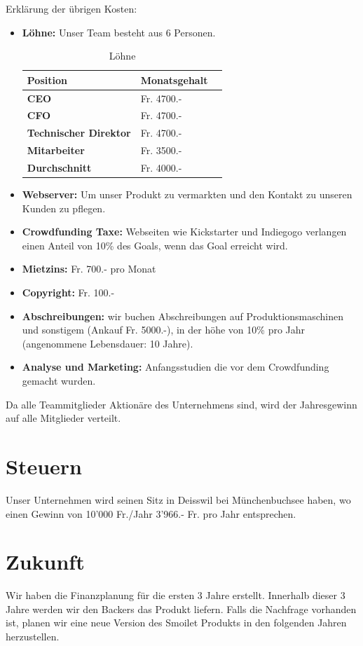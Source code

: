 Erkl\"arung der \"ubrigen Kosten:\\
\begin{itemize}
\item \textbf{L\"ohne:} Unser Team besteht aus 6 Personen. \\
\begin{table}[H]
\centering
\caption{L\"ohne}
\label{L\"ohne}
\begin{tabular}{lll}
\textbf{Position} & \textbf{Monatsgehalt}  \\ \hline
  \textbf{CEO} &  Fr. 4700.- \\ \hline
 \textbf{CFO} &  Fr. 4700.- \\ \hline
 \textbf{Technischer Direktor}& Fr. 4700.-  \\ \hline
 \textbf{Mitarbeiter} &Fr.  3500.- \\ \hline
 \textbf{Durchschnitt} & Fr. 4000.-\\ \hline
\end{tabular}
\end{table}
\item \textbf{Webserver:} Um unser Produkt zu vermarkten und den Kontakt zu unseren Kunden zu pflegen.

\item \textbf{Crowdfunding Taxe:} Webseiten wie Kickstarter und Indiegogo verlangen einen Anteil von 10\% des Goals, wenn das Goal erreicht wird.
\item \textbf{Mietzins:} Fr. 700.- pro Monat
\item \textbf{Copyright:} Fr. 100.-
\item \textbf{Abschreibungen:} wir buchen Abschreibungen auf Produktionsmaschinen und sonstigem (Ankauf Fr. 5000.-), in der h\"ohe von 10\% pro Jahr (angenommene Lebensdauer: 10 Jahre).
\item \textbf{Analyse und Marketing:} Anfangsstudien die vor dem Crowdfunding gemacht wurden.
\end{itemize}
Da alle Teammitglieder Aktion\"are des Unternehmens sind, wird der Jahresgewinn auf alle Mitglieder verteilt.
\section{Steuern}
Unser Unternehmen wird seinen Sitz in Deisswil bei M\"unchenbuchsee haben, wo einen Gewinn von 10'000 Fr./Jahr  3'966.- Fr. pro Jahr entsprechen. 
\section{Zukunft}
Wir haben die Finanzplanung f\"ur die ersten 3 Jahre erstellt. Innerhalb dieser 3 Jahre werden wir den Backers das Produkt liefern. Falls die Nachfrage vorhanden ist, planen wir eine neue Version des Smoilet Produkts in den folgenden Jahren herzustellen. 
